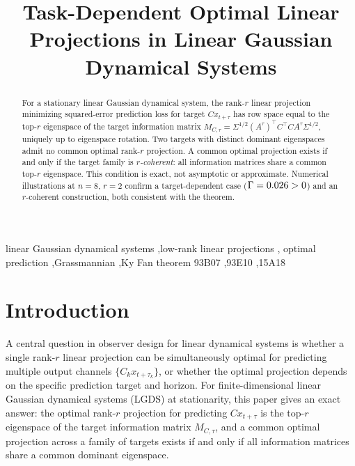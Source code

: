 \documentclass[final,3p,times]{elsarticle}
\begin{document}
\begin{frontmatter}

\title{Task-Dependent Optimal Linear Projections in
       Linear Gaussian Dynamical Systems}


\begin{abstract}
For a stationary linear Gaussian dynamical system, the rank-$r$ linear
projection minimizing squared-error prediction loss for target $Cx_{t+\tau}$
has row space equal to the top-$r$ eigenspace of the target information
matrix $M_{C,\tau} = \Sigma^{1/2}(A^\tau)^\top C^\top CA^\tau\Sigma^{1/2}$,
uniquely up to eigenspace rotation.
Two targets with distinct dominant eigenspaces admit no common optimal
rank-$r$ projection.
A common optimal projection exists if and only if the target family is
\emph{$r$-coherent}: all information matrices share a common top-$r$
eigenspace.
This condition is exact, not asymptotic or approximate.
Numerical illustrations at $n=8$, $r=2$ confirm a target-dependent case
($\Gamma=0.026>0$) and an $r$-coherent construction, both consistent
with the theorem.
\end{abstract}

\begin{keyword}
linear Gaussian dynamical systems \sep low-rank linear projections \sep
optimal prediction \sep Grassmannian \sep Ky Fan theorem
\MSC[2020] 93B07 \sep 93E10 \sep 15A18
\end{keyword}

\end{frontmatter}

\section{Introduction}

A central question in observer design for linear dynamical systems is whether
a single rank-$r$ linear projection can be simultaneously optimal for predicting
multiple output channels $\{C_k x_{t+\tau_k}\}$, or whether the optimal
projection depends on the specific prediction target and horizon.
For finite-dimensional linear Gaussian dynamical systems (LGDS) at
stationarity, this paper gives an exact answer: the optimal rank-$r$ projection
for predicting $Cx_{t+\tau}$ is the top-$r$ eigenspace of the target
information matrix $M_{C,\tau}$, and a common optimal projection across a family
of targets exists if and only if all information matrices share a common
dominant eigenspace.
\end{document}
